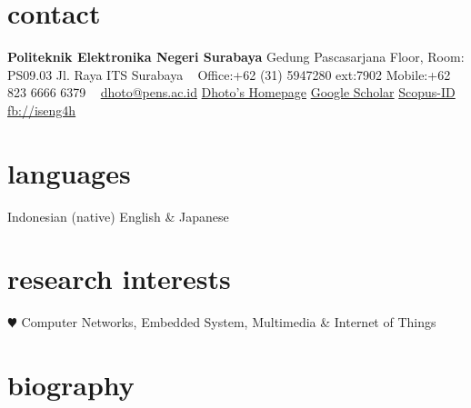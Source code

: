 \documentclass[]{friggeri-cv} %
\begin{document}


\begin{aside} %
\section{contact}
\textbf{Politeknik Elektronika Negeri Surabaya}
Gedung Pascasarjana  Floor, Room: PS09.03
Jl. Raya ITS Surabaya
~
Office:+62 (31) 5947280 ext:7902
Mobile:+62 823 6666 6379
~
\href{mailto:dhoto@pens.ac.id}{dhoto@pens.ac.id}
\href{http://dhoto.lecturer.pens.ac.id/}{Dhoto's Homepage}
\href{https://scholar.google.co.id/citations?user=M6sGfNQAAAAJ&hl=en&oi=ao}{Google Scholar}
\href{https://www.scopus.com/authid/detail.uri?authorId=35100882700}{Scopus-ID}
\href{http://facebook.com/iseng4h}{fb://iseng4h}


\section{languages}
Indonesian (native)
English \& Japanese 


\section{research interests}
{\color{red} $\varheartsuit$} Computer Networks,
Embedded System, Multimedia \& Internet of Things
\end{aside}


\section{biography}
\end{document}
